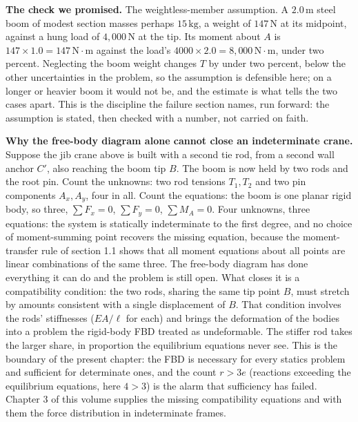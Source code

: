 \textbf{The check we promised.} The weightless-member assumption. A
$2.0\,\si{\meter}$ steel boom of modest section masses perhaps $15\,\si{
\kilogram}$, a weight of $147\,\text{N}$ at its midpoint, against a hung
load of $4{,}000\,\text{N}$ at the tip. Its moment about $A$ is $147
\times 1.0 = 147\,\text{N}\cdot\text{m}$ against the load's $4000 \times
2.0 = 8{,}000\,\text{N}\cdot\text{m}$, under two percent. Neglecting the
boom weight changes $T$ by under two percent, below the other
uncertainties in the problem, so the assumption is defensible here; on a
longer or heavier boom it would not be, and the estimate is what tells the
two cases apart. This is the discipline the failure section names, run
forward: the assumption is stated, then checked with a number, not carried
on faith.

\begin{mastery}
\textbf{Why the free-body diagram alone cannot close an indeterminate
crane.} Suppose the jib crane above is built with a second tie rod, from a
second wall anchor $C'$, also reaching the boom tip $B$. The boom is now
held by two rods and the root pin. Count the unknowns: two rod tensions
$T_1, T_2$ and two pin components $A_x, A_y$, four in all. Count the
equations: the boom is one planar rigid body, so three, $\sum F_x = 0$,
$\sum F_y = 0$, $\sum M_A = 0$. Four unknowns, three equations: the system
is statically indeterminate to the first degree, and no choice of
moment-summing point recovers the missing equation, because the
moment-transfer rule of section 1.1 shows that all moment equations about
all points are linear combinations of the same three. The free-body
diagram has done everything it can do and the problem is still open. What
closes it is a compatibility condition: the two rods, sharing the same tip
point $B$, must stretch by amounts consistent with a single displacement
of $B$. That condition involves the rods' stiffnesses ($EA/\ell$ for each)
and brings the deformation of the bodies into a problem the rigid-body FBD
treated as undeformable. The stiffer rod takes the larger share, in
proportion the equilibrium equations never see. This is the boundary of
the present chapter: the FBD is necessary for every statics problem and
sufficient for determinate ones, and the count $r > 3e$ (reactions
exceeding the equilibrium equations, here $4 > 3$) is the alarm that
sufficiency has failed. Chapter 3 of this volume supplies the missing
compatibility equations and with them the force distribution in
indeterminate frames.
\end{mastery}

